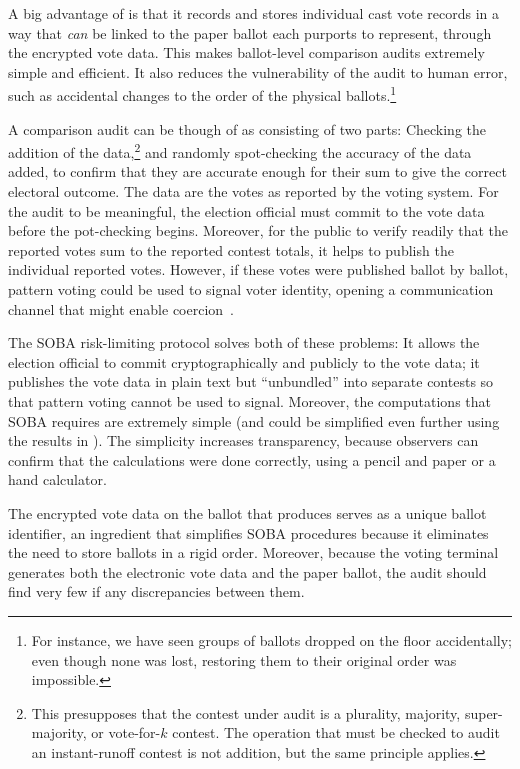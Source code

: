 A big advantage of \projname is that it records and stores individual cast vote records in a way that 
{\em can\/} be linked to
the paper ballot each purports to represent, through the encrypted vote data.
This makes ballot-level comparison audits extremely simple and efficient.
It also reduces the vulnerability of the audit to human error, such as accidental changes to the order
of the physical ballots.\footnote{%
   For instance, we have seen groups of ballots dropped on the floor accidentally;
   even though none was lost, restoring them to their original order was impossible.
}

A comparison audit can be though of as consisting of two parts:
Checking the addition of the data,\footnote{%
   This presupposes that the contest under audit is a plurality, majority, super-majority, or vote-for-$k$
   contest.
   The operation that must be checked to audit an instant-runoff contest is not addition, but the
   same principle applies.
}
and randomly spot-checking the accuracy of the data added, to confirm that they are accurate
enough for their sum to give the correct electoral outcome.
The data are the votes as reported by the voting system.
For the audit to be meaningful, the election official must commit to the vote data before the
pot-checking begins.
Moreover, for the public to verify readily that the reported votes sum to the reported contest totals,
it helps to publish the individual reported votes.
However, if these votes were published ballot by ballot, pattern voting could be used to signal voter identity,
opening a communication channel that might enable coercion~\cite{rescorla09,benalohEtal11}.

The SOBA risk-limiting protocol \cite{benalohEtal11} solves both of these problems:
It allows the election official to commit cryptographically and publicly to the vote data; it publishes
the vote data in plain text but ``unbundled'' into separate contests so that pattern voting cannot
be used to signal.
Moreover, the computations that SOBA requires are extremely simple (and could be simplified
even further using the results in \cite{lindemanStark12}).
The simplicity increases transparency, because observers can confirm that the calculations
were done correctly, using a pencil and paper or a hand calculator.

The encrypted vote data on the ballot that \projname produces serves as a unique ballot identifier,
an ingredient that simplifies SOBA procedures because it eliminates the need to store ballots in a rigid order.
Moreover, because the voting terminal generates both the electronic vote data and the paper ballot, 
the audit should find very few if any discrepancies between them.

